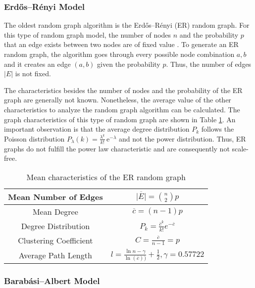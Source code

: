 \subsubsection{Erdős–Rényi Model}

The oldest random graph algorithm is the 
Erdős–Rényi (ER) random graph. For this type of random graph model, the
number of nodes $n$ and the probability $p$ that an 
edge exists between two nodes are of fixed value \cite{basicnetwork}. 
To generate an ER random graph, the algorithm goes through 
every possible node combination $a, b$ and it creates an edge 
$(a, b)$ given the probability $p$. 
Thus, the number of edges $|E|$ is not fixed.

The characteristics besides the number of nodes and the
probability of the ER graph are generally not known.
Nonetheless, the average value of the other
characteristics to analyze the random graph algorithm can be calculated.
The graph characteristics of this type of random graph are shown in Table 
\ref{erdos-model}.
An important observation is that 
the average degree distribution $P_k$ follows the Poisson distribution
$P_\lambda (k) = \frac{\lambda^k}{k!}\, \mathrm{e}^{-\lambda}$ and
not the power distribution. Thus,
ER graphs do not fulfill the power law characteristic and are consequently
not scale-free. 

\begin{table}[ht!]
    \centering
    \begin{tabular}{|c | c |} 
     \hline
     Mean Number of Edges & 
     $\overline{|E|} = \binom{n}{2}p$  \\ 
     \hline
     Mean Degree & 
     $\overline{c} = (n-1)p$ \\ 
     \hline
     Degree Distribution & 
     $P_k = \frac{\overline{c}^k}{k!} e^{-\overline{c}}$ \\ 
     \hline
     Clustering Coefficient & 
     $C=\frac{\overline{c}}{n-1}=p$ \\ 
     \hline
     Average Path Length \cite{averagepath}& 
     $l = \frac{\ln{n} - \gamma}{\ln(\overline{c}))} + \frac{1}{2}, 
     \gamma=0.57722$ \\ 
     \hline
    \end{tabular}
    \caption{Mean characteristics of the ER random graph \cite{basicnetwork}}
    \label{erdos-model}
\end{table}

\subsubsection{Barabási–Albert Model}

